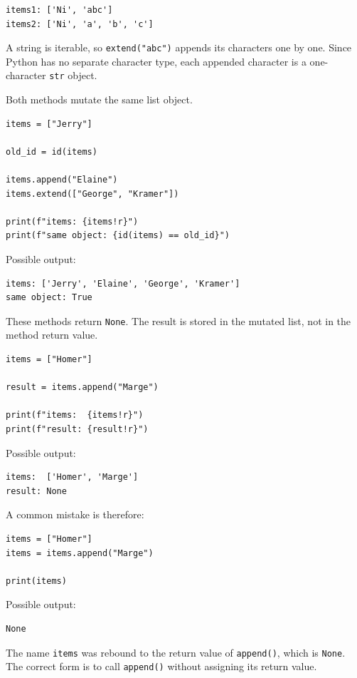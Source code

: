 \begin{verbatim}
items1: ['Ni', 'abc']
items2: ['Ni', 'a', 'b', 'c']
\end{verbatim}

A string is iterable, so \texttt{extend("abc")} appends its characters one by one. Since Python has no separate character type, each appended character is a one-character \texttt{str} object.

Both methods mutate the same list object.

\begin{verbatim}
items = ["Jerry"]

old_id = id(items)

items.append("Elaine")
items.extend(["George", "Kramer"])

print(f"items: {items!r}")
print(f"same object: {id(items) == old_id}")
\end{verbatim}

Possible output:

\begin{verbatim}
items: ['Jerry', 'Elaine', 'George', 'Kramer']
same object: True
\end{verbatim}

These methods return \texttt{None}. The result is stored in the mutated list, not in the method return value.

\begin{verbatim}
items = ["Homer"]

result = items.append("Marge")

print(f"items:  {items!r}")
print(f"result: {result!r}")
\end{verbatim}

Possible output:

\begin{verbatim}
items:  ['Homer', 'Marge']
result: None
\end{verbatim}

A common mistake is therefore:

\begin{verbatim}
items = ["Homer"]
items = items.append("Marge")

print(items)
\end{verbatim}

Possible output:

\begin{verbatim}
None
\end{verbatim}

The name \texttt{items} was rebound to the return value of \texttt{append()}, which is \texttt{None}. The correct form is to call \texttt{append()} without assigning its return value.

